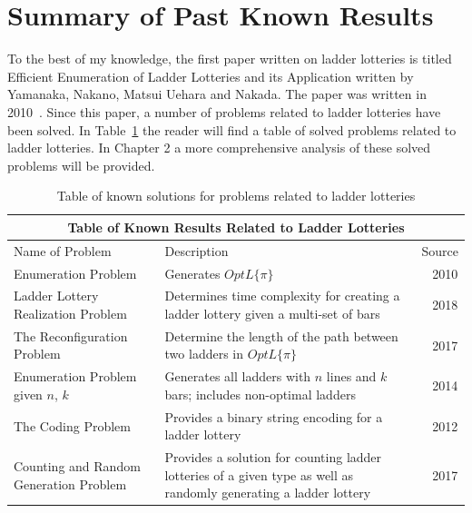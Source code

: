 \section{Summary of Past Known Results}
To the best of my knowledge, the first paper written on ladder lotteries is titled Efficient Enumeration of 
Ladder Lotteries and its Application written by Yamanaka, Nakano, Matsui Uehara and Nakada. The paper 
was written in 2010~\cite{A1}. Since this paper, 
a number of problems related to ladder lotteries have been solved. In Table~\ref{Table:KnownProblems} 
the reader will find a table of solved problems related to ladder lotteries. In Chapter 2 a more comprehensive analysis of these 
solved problems will be provided.
\begin{table}[h]
	\centering
	\begin{tabular}{|p{4cm}||p{4cm}||p{4cm}|}
		\hline 
		\multicolumn{3}{|c|}{Table of Known Results Related to Ladder Lotteries}\\
		\hline 
		\hline 
		Name of Problem & Description & Source \\ 
		\hline 
		\small{Enumeration Problem} & \small{Generates $OptL\{\pi\}$} &~\cite{A1} 2010\\ 
		\hline
		\small{Ladder Lottery \newline Realization Problem} & \small{Determines time complexity for creating a ladder lottery given a multi-set of bars} &~\cite{A3} 2018\\ 
		\hline
		\small{The Reconfiguration \newline Problem} & \small{Determine the length of the path between two ladders in $OptL\{\pi\}$} &~\cite{A2} 2017\\ 
		\hline 
		\small{Enumeration Problem \newline given $n$, $k$} & \small{Generates all ladders with $n$ lines and $k$ bars; includes non-optimal ladders} &~\cite{A4} 2014\\ 
		\hline
		\small{The Coding Problem} & \small{Provides a binary string encoding for a ladder lottery} &~\cite{A5} 2012\\ 
		\hline 
		\small{Counting and \newline Random Generation \newline Problem} & \small{Provides a solution for counting ladder lotteries of a given type as well as randomly generating a ladder lottery} &~\cite{A6} 2017\\ 
		\hline
		
																



	\end{tabular}
	\caption{Table of known solutions for problems related to ladder lotteries}
	\label{Table:KnownProblems}
\end{table}

